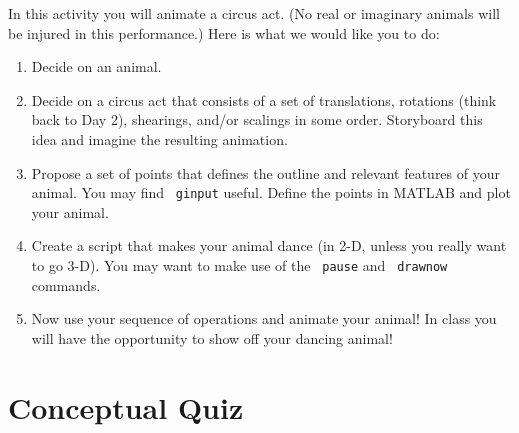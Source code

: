 In this activity you will animate a circus act. (No real or imaginary animals will be injured in this performance.) Here is what we would like you to do:

\begin{prob}
\begin{enumerate}
\item Decide on an animal.
\item Decide on a circus act that consists of a set of translations, rotations (think back to Day 2), shearings, and/or scalings in some order. Storyboard this idea and imagine the resulting animation.
\item Propose a set of points that defines the outline and relevant features of your animal. You may find \texttt{ ginput} useful. Define the points in MATLAB and plot your animal.
\item Create a script that makes your animal dance (in 2-D, unless you really want to go 3-D).  You may want to make use of the \texttt{ pause} and \texttt{ drawnow} commands. 
\item Now use your sequence of operations and animate your animal! In class you will have the opportunity to show off your dancing animal!
\end{enumerate}
\end{prob}

\section{Conceptual Quiz}

